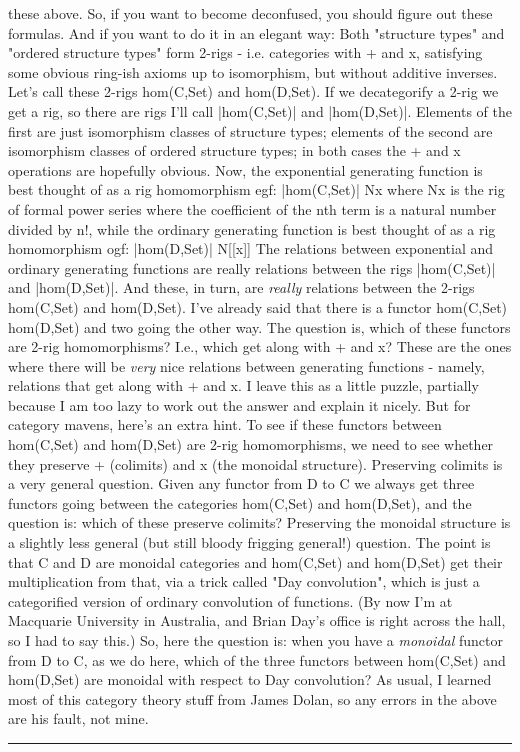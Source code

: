these above.  So, if you want to become deconfused, you 
should figure out these formulas.
And if you want to do it in an elegant way: 
Both "structure types" and "ordered structure types" 
form 2-rigs - 
i.e. categories with + and x, satisfying some obvious ring-ish 
axioms up to isomorphism, but without additive inverses.
Let's call these 2-rigs hom(C,Set) and hom(D,Set).  
If we decategorify a 2-rig we get a rig, so there are rigs I'll call 
|hom(C,Set)| and |hom(D,Set)|.  Elements of the first are just isomorphism
classes of structure types; elements of the second are isomorphism
classes of ordered structure types; in both cases the + and x 
operations are hopefully obvious.
Now, the exponential generating function is best thought of as
a rig homomorphism
egf: |hom(C,Set)| \to  N{{x}}
where N{{x}} is the rig of formal power series where the
coefficient of the nth term is a natural number divided by n!,
while the ordinary generating function is best thought of as
a rig homomorphism
ogf: |hom(D,Set)| \to  N[[x]]
The relations between exponential and ordinary generating 
functions are really relations between the rigs |hom(C,Set)| 
and |hom(D,Set)|.  And these, in turn, are \emph{really} relations 
between the 2-rigs hom(C,Set) and hom(D,Set).  
I've already said that there is a functor 
hom(C,Set) \to  hom(D,Set)
and two going the other way.  The question is, which of these
functors are 2-rig homomorphisms?  I.e., which get along with
+ and x?  These are the ones where there will be \emph{very} nice
relations between generating functions - namely, relations 
that get along with + and x.
I leave this as a little puzzle, partially because I am
too lazy to work out the answer and explain it nicely.
But for category mavens, here's an extra hint.  To see if
these functors between hom(C,Set) and hom(D,Set) are 2-rig
homomorphisms, we need to see whether they preserve + (colimits)
and x (the monoidal structure).  
Preserving colimits is a very general question.
Given any functor from D to C we always 
get three functors going between the categories 
hom(C,Set) and hom(D,Set), and the question is: which of 
these preserve colimits?
Preserving the monoidal structure is a slightly less general 
(but still bloody frigging general!) question.  The point is that
C and D are monoidal categories and hom(C,Set) and hom(D,Set)
get their multiplication from that, via a trick called "Day
convolution", which is just a categorified version of ordinary 
convolution of functions.  (By now I'm at Macquarie University
in Australia, and Brian Day's office is right across the hall,
so I had to say this.)  
So, here the question is: when you have a \emph{monoidal} functor from 
D to C, as we do here, which of the three functors between hom(C,Set) 
and hom(D,Set) are monoidal with respect to Day convolution?
As usual, I learned most of this category theory stuff from 
James Dolan, so any errors in the above are his fault, not mine.  

\par\noindent\rule{\textwidth}{0.4pt}


